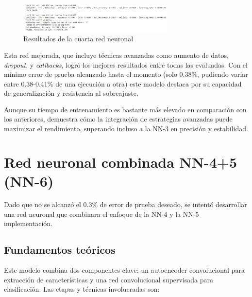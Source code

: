 \begin{figure}[H]
	\centering
	\includegraphics[width=0.7\textwidth]{imgs/results-red5.JPG}
	\caption{Resultados de la cuarta red neuronal}
	\label{fig:results-red5}
\end{figure}

Esta red mejorada, que incluye técnicas avanzadas como aumento de datos, \textit{dropout}, y \textit{callbacks}, logró los mejores resultados entre todas las evaluadas. Con el mínimo error de prueba alcanzado hasta el momento (solo 0.38\%, pudiendo variar entre 0.38-0.41\% de una ejecución a otra) este modelo destaca por su capacidad de generalización y resistencia al sobreajuste.

Aunque su tiempo de entrenamiento es bastante más elevado en comparación con los anteriores, demuestra cómo la integración de estrategias avanzadas puede maximizar el rendimiento, superando incluso a la NN-3 en precisión y estabilidad.

\newpage
\section{Red neuronal combinada NN-4+5 (NN-6)}

Dado que no se alcanzó el 0.3\% de error de prueba deseado, se intentó desarrollar una red neuronal que combinara el enfoque de la NN-4 y la NN-5 implementación.

\subsection{Fundamentos teóricos}

Este modelo combina dos componentes clave: un autoencoder convolucional para extracción de características y una red convolucional supervisada para clasificación. Las etapas y técnicas involucradas son:

